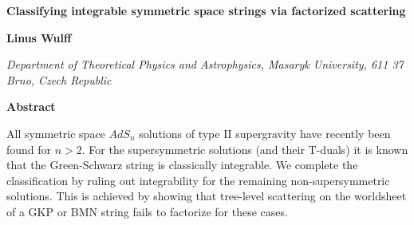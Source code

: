 \documentclass[a4paper,11pt]{article}
\begin{document}
\hfill{ %
}

\vspace{30pt}

\begin{center}
{\huge{\bf Classifying integrable symmetric space strings via factorized scattering}}

\vspace{50pt}

{\bf Linus Wulff}

\vspace{15pt}

{\it\small Department of Theoretical Physics and Astrophysics, Masaryk University, 611 37 Brno, Czech Republic}\\

\vspace{100pt}

{\bf Abstract}
\end{center}
\noindent
All symmetric space $AdS_n$ solutions of type II supergravity have recently been found for $n>2$. For the supersymmetric solutions (and their T-duals) it is known that the Green-Schwarz string is classically integrable. We complete the classification by ruling out integrability for the remaining non-supersymmetric solutions. This is achieved by showing that tree-level scattering on the worldsheet of a GKP or BMN string fails to factorize for these cases.

\pagebreak 
\tableofcontents


\setcounter{page}{1}

\end{document}
